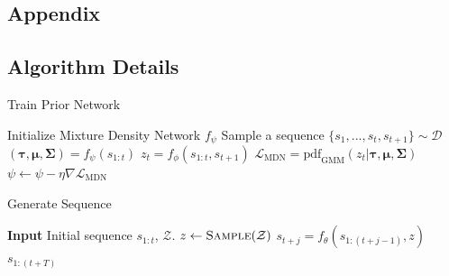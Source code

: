 \documentclass{article}
\begin{document}
%

\newpage




\newpage

\begin{appendices}
\section{Appendix}

\subsection{Algorithm Details}

\begin{minipage}[t]{7cm}
  \vspace{0pt}

  \begin{algorithm}[H]
    \caption{Train Prior Network}
    \begin{algorithmic}[1]
    \State Initialize Mixture Density Network $f_\psi$
    \State Sample a sequence $\{s_1, ..., s_t, s_{t+1}\} \sim \mathcal{D}$
    \State $(\bm{\tau}, \bm{\mu}, \bm{\Sigma}) = f_{\psi}(s_{1:t})$
    \State $z_t = f_{\phi}(s_{1:t}, s_{t+1})$
      \State $\mathcal{L}_\text{MDN} = \text{pdf}_\text{GMM}(z_t | \bm{\tau}, \bm{\mu}, \bm{\Sigma})$\footnotemark
    \State $\psi \gets \psi - \eta \nabla \mathcal{L}_\text{MDN}$
    \EndWhile
  \end{algorithmic}
  \end{algorithm}
\end{minipage}%
\begin{minipage}[t]{7cm}
  \vspace{0pt}

\begin{algorithm}[H]
  \caption{Generate Sequence}\label{algo-sample}
  \begin{algorithmic}[1]
    \State \textbf{Input} Initial sequence $s_{1:t}$, $\mathcal{Z}$.
    \State $z \gets \textsc{Sample}(\mathcal{Z})$
    \State $s_{t+j} = f_\theta(s_{1:(t+j-1)}, z)$
    \EndFor
    \Return $s_{1:(t+T)}$
    \State
    \State
    \State
    \State
  \end{algorithmic}
\end{algorithm}
\end{minipage}


\end{appendices}
\end{document}
